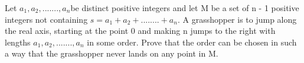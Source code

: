 
\item Let $a_1, a_2,......., a_n $be distinct positive integers and let M be a set of n - 1 positive integers not containing $s = a_1 + a_2 +........+ a_n$. A grasshopper is to jump along the real axis, starting at the point 0 and making n jumps to the right with lengths $a_1, a_2,......., a_n$ in some order. Prove that the order can be chosen in such a way that the grasshopper never lands on any point in M.
